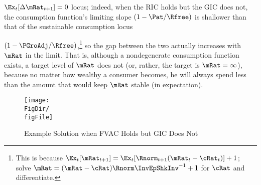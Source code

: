 \documentclass[titlepage]{\econtex}\providecommand{\texname}{BufferStockTheory}
\providecommand{\FigDir}{Figures}
\begin{document}
$\Ex_{t}[\Delta \mRat_{t+1}]=0$ locus; indeed, when the RIC holds but
the GIC does not, the consumption function's limiting slope
$(1-\Pat/\Rfree)$ is shallower than that of the sustainable consumption
locus {$(1-\PGroAdj/\Rfree)$,\footnote{This is because
    $\Ex_{t}[\mRat_{t+1}]=\Ex_{t}[\Rnorm_{t+1}(\mRat_{t}-\cRat_{t})]+1$; solve $\mRat = (\mRat - \cRat)\Rnorm \InvEpShkInv^{-1}+1$ for $\cRat$ and differentiate.}
  so the gap between the two actually increases with $\mRat$ in the
  limit.  That is, although a nondegenerate consumption function
  exists, a target level of $\mRat$ does not (or, rather, the
  target is $\mRat=\infty$), because no matter how wealthy a consumer
  becomes, he will always spend less than the amount that
  would keep $\mRat$ stable (in expectation).

\renewcommand{\figFile}{FVACnotGIC}
\hypertarget{\figFile}{}  
\begin{figure}[tbp]
\centerline{\texttt{[image: \\FigDir/\\figFile]}}
\caption{Example Solution when FVAC Holds but GIC Does Not}
\label{fig:\figFile}
\end{figure}

\begin{comment}
The foregoing has some connection with the theoretical results in
Szeidl~\citeyearpar{szeidlInvariant}, who shows that the condition we
call the GIC guarantees that $\mRat$ will have an asymptotically
bounded mean.  He also shows that under these circumstances $\mRat$
satisfies conditions he proves to be necessary for the existence of a
stable invariant distribution.  Furthermore, $\aRat$, $\bRat$, and $\cRat$
are also shown to have stable invariant distributions and asymptotically
bounded means.  We make use of these results below.
\end{comment}

\begin{comment} 
A final point worth reemphasizing is that neither the Return
Impatience Condition nor the Finite Human Wealth Condition was
required for the contraction mapping proof.  Both these conditions are
necessary for a nondegenerate solution to exist in the unconstrained
perfect foresight case.  This is noteworthy because in some models and
in many economists' intuition, the introduction of uncertainty reduces
the space of parameter values for which a unique solution exists;
here, precisely the opposite occurs.  Indeed, many of the
parameterizations newly eligible for solution are quite plausible, so
this observation is not merely a curiosum but of real practical
value.\footnote{An easy example of a case where the perfect foresight
  model has no solution is where $\Rfree >1$, $\DiscFac = 1/\Rfree$
  and $\PGro > \Rfree$.}
\end{comment}

}
\end{document}
